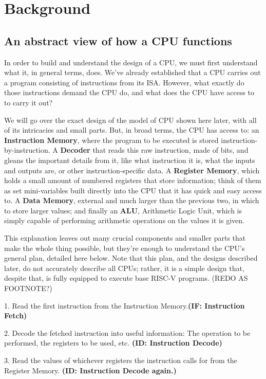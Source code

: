 \documentclass[12pt,twoside]{reedthesis}
\begin{document}
\chapter{Background}
\section{An abstract view of how a CPU functions}
In order to build and understand the design of a CPU, we must first understand what it, in general terms, does. We've already established that a CPU carries out a program consisting of instructions from its ISA. However, what exactly do those instructions demand the CPU do, and what does the CPU have access to to carry it out?

We will go over the exact design of the model of CPU shown here later, with all of its intricacies and small parts. But, in broad terms, the CPU has access to: an \textbf{Instruction Memory}, where the program to be executed is stored instruction-by-instruction. A \textbf{Decoder} that reads this raw instruction, made of bits, and gleans the important details from it, like what instruction it is, what the inputs and outputs are, or other instruction-specific data. A \textbf{Register Memory}, which holds a small amount of numbered registers that store information; think of them as set mini-variables built directly into the CPU that it has quick and easy access to. A \textbf{Data Memory}, external and much larger than the previous two, in which to store larger values; and finally an \textbf{ALU}, Arithmetic Logic Unit, which is simply capable of performing arithmetic operations on the values it is given.

This explanation leaves out many crucial components and smaller parts that make the whole thing possible, but they're enough to understand the CPU's general plan, detailed here below. Note that this plan, and the designs described later, do not accurately describe all CPUs; rather, it is a simple design that, despite that, is fully equipped to execute base RISC-V programs. (REDO AS FOOTNOTE?)

1. Read the first instruction from the Instruction Memory.\textbf{(IF: Instruction Fetch)}

2. Decode the fetched instruction into useful information: The operation to be performed, the registers to be used, etc. \textbf{(ID: Instruction Decode)}

3. Read the values of whichever registers the instruction calls for from the Register Memory. \textbf{(ID: Instruction Decode again.)}
\end{document}
